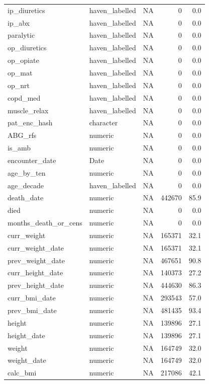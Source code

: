 \documentclass[
  11pt,
  letterpaper,
  DIV=11,
  numbers=noendperiod]{scrartcl}
\begin{document}
\begin{longtable*}{llrrr}
\addlinespace
ip\_diuretics & haven\_labelled & NA & 0 & 0.0\\
ip\_abx & haven\_labelled & NA & 0 & 0.0\\
paralytic & haven\_labelled & NA & 0 & 0.0\\
op\_diuretics & haven\_labelled & NA & 0 & 0.0\\
op\_opiate & haven\_labelled & NA & 0 & 0.0\\
\addlinespace
op\_mat & haven\_labelled & NA & 0 & 0.0\\
op\_nrt & haven\_labelled & NA & 0 & 0.0\\
copd\_med & haven\_labelled & NA & 0 & 0.0\\
muscle\_relax & haven\_labelled & NA & 0 & 0.0\\
pat\_enc\_hash & character & NA & 0 & 0.0\\
\addlinespace
ABG\_rfs & numeric & NA & 0 & 0.0\\
is\_amb & numeric & NA & 0 & 0.0\\
encounter\_date & Date & NA & 0 & 0.0\\
age\_by\_ten & numeric & NA & 0 & 0.0\\
age\_decade & haven\_labelled & NA & 0 & 0.0\\
\addlinespace
death\_date & numeric & NA & 442670 & 85.9\\
died & numeric & NA & 0 & 0.0\\
months\_death\_or\_cens & numeric & NA & 0 & 0.0\\
curr\_weight & numeric & NA & 165371 & 32.1\\
curr\_weight\_date & numeric & NA & 165371 & 32.1\\
\addlinespace
prev\_weight\_date & numeric & NA & 467651 & 90.8\\
curr\_height\_date & numeric & NA & 140373 & 27.2\\
prev\_height\_date & numeric & NA & 444630 & 86.3\\
curr\_bmi\_date & numeric & NA & 293543 & 57.0\\
prev\_bmi\_date & numeric & NA & 481435 & 93.4\\
\addlinespace
height & numeric & NA & 139896 & 27.1\\
height\_date & numeric & NA & 139896 & 27.1\\
weight & numeric & NA & 164749 & 32.0\\
weight\_date & numeric & NA & 164749 & 32.0\\
calc\_bmi & numeric & NA & 217086 & 42.1\\

\end{longtable*}
\end{document}
